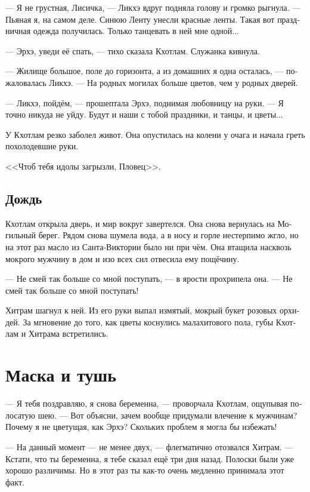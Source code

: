 \documentclass[a4paper,12pt,fleqn]{book}\usepackage{cooltooltips}\usepackage{polyglossia}\setdefaultlanguage{russian}\setotherlanguage{english}\defaultfontfeatures{Ligatures=TeX,Mapping=tex-text} \usepackage{xcolor}\definecolor{lightgray}{HTML}{bbbbbb}\color{lightgray}\newcommand{\ml}[3]{\textenglish{\textcolor{black}{#3}}}
\begin{document}
--- Я не грустная, Лисичка, --- Ликхэ вдруг подняла голову и громко рыгнула.
--- Пьяная я, на самом деле.
Синюю Ленту унесли красные ленты.
Такая вот праздничная одежда получилась.
Только танцевать в ней мне одной...

--- Эрхэ, уведи её спать, --- тихо сказала Кхотлам.
Служанка кивнула.

--- Жилище большое, поле до горизонта, а из домашних я одна осталась, --- пожаловалась Ликхэ.
--- На родных могилах больше цветов, чем у родных дверей. 

--- Ликхэ, пойдём, --- прошептала Эрхэ, поднимая любовницу на руки.
--- Я точно никуда не уйду.
Будут и наши с тобой праздники, и танцы, и цветы...

У Кхотлам резко заболел живот.
Она опустилась на колени у очага и начала греть похолодевшие руки.

<<Чтоб тебя идолы загрызли, Пловец>>.

\section{Дождь}

Кхотлам открыла дверь, и мир вокруг завертелся.
Она снова вернулась на Могильный берег.
Рядом снова шумела вода, а в носу и горле нестерпимо жгло, но на этот раз масло из Санта-Виктории было ни при чём.
Она втащила насквозь мокрого мужчину в дом и изо всех сил отвесила ему пощёчину.

--- Не смей так больше со мной поступать, --- в ярости прохрипела она.
--- Не смей так больше со мной поступать!

Хитрам шагнул к ней.
Из его руки выпал измятый, мокрый букет розовых орхидей.
За мгновение до того, как цветы коснулись малахитового пола, губы Кхотлам и Хитрама встретились.

\chapter{Маска и тушь}

--- Я тебя поздравляю, я снова беременна, --- проворчала Кхотлам, ощупывая полосатую шею.
--- Вот объясни, зачем вообще придумали влечение к мужчинам?
Почему я не цветущая, как Эрхэ?
Скольких проблем я могла бы избежать!

--- На данный момент --- не менее двух, --- флегматично отозвался Хитрам.
--- Кстати, что ты беременна, я тебе сказал ещё три дня назад.
Полоски были уже хорошо различимы.
Но в этот раз ты как-то очень медленно принимала этот факт.
\end{document}
